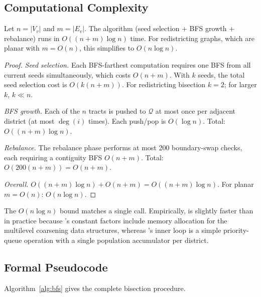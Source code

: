 \subsection{Computational Complexity}

\begin{proposition}
\label{prop:complexity}
Let $n = |V_v|$ and $m = |E_v|$.
The \bfsg{} algorithm (seed selection + BFS growth + rebalance) runs in
$O((n + m) \log n)$ time.
For redistricting graphs, which are planar with $m = O(n)$, this simplifies
to $O(n \log n)$.
\end{proposition}

\begin{proof}
\textit{Seed selection.}
Each BFS-farthest computation requires one BFS from all current seeds
simultaneously, which costs $O(n + m)$.
With $k$ seeds, the total seed selection cost is $O(k(n + m))$.
For redistricting bisection $k = 2$; for larger $k$, $k \ll n$.

\textit{BFS growth.}
Each of the $n$ tracts is pushed to $\mathcal{Q}$ at most once per
adjacent district (at most $\deg(i)$ times).
Each push/pop is $O(\log n)$.
Total: $O((n + m) \log n)$.

\textit{Rebalance.}
The rebalance phase performs at most 200 boundary-swap checks, each
requiring a contiguity BFS $O(n + m)$.
Total: $O(200(n + m)) = O(n + m)$.

\textit{Overall.}
$O((n + m) \log n) + O(n + m) = O((n + m) \log n)$.
For planar $m = O(n)$: $O(n \log n)$.
\end{proof}

\begin{remark}
The $O(n \log n)$ bound matches a single \metis{} call.
Empirically, \bfsg{} is slightly faster than \metis{} in practice because
\metis{}'s constant factors include memory allocation for the multilevel
coarsening data structures, whereas \bfsg{}'s inner loop is a simple
priority-queue operation with a single population accumulator per district.
\end{remark}

\subsection{Formal Pseudocode}

Algorithm~\ref{alg:bfs} gives the complete \bfsg{} bisection procedure.

